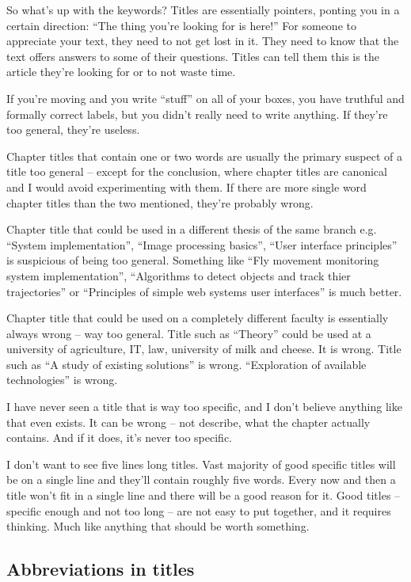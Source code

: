So what's up with the keywords? Titles are essentially pointers, ponting you in a certain direction: ``The thing you're looking for is here!'' For someone to appreciate your text, they need to not get lost in it. They need to know that the text offers answers to some of their questions. Titles can tell them this is the article they're looking for or to not waste time.

If you're moving and you write ``stuff'' on all of your boxes, you have truthful and formally correct labels, but you didn't really need to write anything. If they're too general, they're useless.

Chapter titles that contain one or two words are usually the primary suspect of a title too general -- except for the conclusion, where chapter titles are canonical and I would avoid experimenting with them. If there are more single word chapter titles than the two mentioned, they're probably wrong.

Chapter title that could be used in a different thesis of the same branch e.g. ``System implementation'', ``Image processing basics'', ``User interface principles'' is suspicious of being too general. Something like ``Fly movement monitoring system implementation'', ``Algorithms to detect objects and track thier trajectories'' or ``Principles of simple web systems user interfaces'' is much better.

Chapter title that could be used on a completely different faculty is essentially always wrong -- way too general. Title such as ``Theory'' could be used at a university of agriculture, IT, law, university of milk and cheese. It is wrong. Title such as ``A study of existing solutions'' is wrong. ``Exploration of available technologies'' is wrong.

I have never seen a title that is way too specific, and I don't believe anything like that even exists. It can be wrong -- not describe, what the chapter actually contains. And if it does, it's never too specific.

I don't want to see five lines long titles. Vast majority of good specific titles will be on a single line and they'll contain roughly five words. Every now and then a title won't fit in a single line and there will be a good reason for it. Good titles -- specific enough and not too long -- are not easy to put together, and it requires thinking. Much like anything that should be worth something.


\subsection*{Abbreviations in titles}

